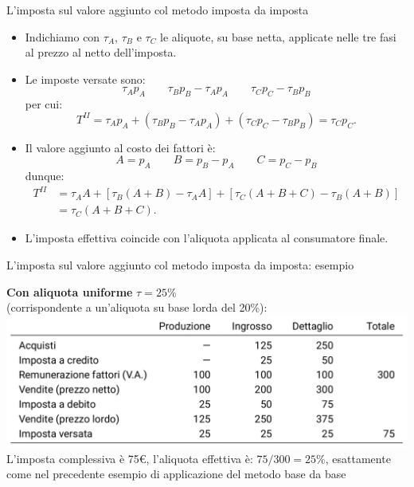 \documentclass[aspectratio=64,11pt]{beamer}
\begin{document}
\begin{frame}{L'imposta sul valore aggiunto col metodo imposta da imposta}
\begin{itemize}
\item Indichiamo con $\tau_A$, $\tau_B$ e $\tau_C$ le aliquote, su base netta,
applicate nelle tre fasi al prezzo al netto dell'imposta.
\item Le imposte versate sono:
\begin{equation*}
\tau_Ap_A \qquad \tau_Bp_B-\tau_Ap_A \qquad \tau_Cp_C-\tau_Bp_B
\end{equation*}
per cui:
\begin{equation*}
  T^{II}=\tau_Ap_A + (\tau_Bp_B-\tau_Ap_A) +
  (\tau_C p_C-\tau_Bp_B)=\tau_Cp_C.
\end{equation*}
\item Il valore aggiunto al costo dei fattori è:
\begin{equation*}
A=p_A \qquad B = p_B-p_A \qquad C=p_C-p_B
\end{equation*}
dunque:
\begin{equation*}
\begin{split}
  T^{II}&=\tau_AA + [\tau_B(A+B)-\tau_AA] + [\tau_C(A+B+C)-\tau_B(A+B)]\\
  &=\tau_C(A+B+C).
\end{split}
\end{equation*}
\item L'imposta effettiva coincide con l'aliquota applicata al consumatore finale.
\end{itemize}
\end{frame}

\begin{frame}{L'imposta sul valore aggiunto col metodo imposta da imposta: esempio}
\begin{block}{}
\textbf{Con aliquota uniforme} $\tau=25\%$\\(corrispondente a un'aliquota su base
lorda del 20\%):\\
\includegraphics[width=\textwidth]{./figure/esempio-imposta-da-imposta-1.png}\\
L'imposta complessiva è 75€, l'aliquota effettiva è: $75/300=25\%$,
esattamente come nel precedente esempio di applicazione del metodo base da
base
\end{block}
\end{frame}
\end{document}
